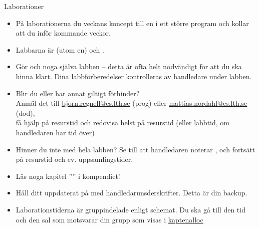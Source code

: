 \begin{SlideExtra}{Laborationer}\SlideFontSmall
\begin{itemize}
\item På laborationerna  du veckans koncept till en  i ett större program och kollar att du  inför kommande veckor.
\item Labbarna är  (utom en) och .

\item Gör  och  noga  själva labben -- detta är ofta helt nödvändigt för att du ska hinna klart. Dina labbförberedelser kontrolleras av handledare under labben.

\item Blir du  eller har annat giltigt förhinder?\\ Anmäl det  till \url{bjorn.regnell@cs.lth.se} (prog) eller \url{mattias.nordahl@cs.lth.se} (dod), \\ få hjälp på resurstid och redovisa helst på resurstid (eller labbtid, om handledaren har tid över)

\item Hinner du inte med hela labben? Se till att handledaren noterar , och fortsätt på resurstid och ev. uppsamlingstider.

\item Läs noga kapitel '''' i kompendiet!
\item Håll ditt  uppdaterat på  med handledarunsderskrifter. Detta är din backup.

\item Laborationstiderna är gruppindelade enligt schemat. Du ska gå till den tid och den sal som motsvarar din grupp som visas i \href{https://fileadmin.cs.lth.se/pgk/kaptenalloc/}{kaptenalloc}\\
\end{itemize}
\end{SlideExtra}




